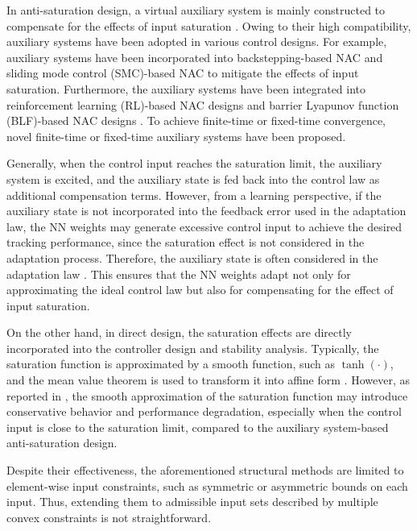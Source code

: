 \documentclass[letterpaper, journal]{IEEEtran}
\begin{document}
In anti-saturation design, a virtual auxiliary system is mainly constructed to compensate for the effects of input saturation \cite{Ma:2025aa,Gao:2026aa,Yang:2021aa,Jia:2020aa,Liu:2024aa,Liu:2025aa,Gao:2017aa,Esfandiari:2014aa,Esfandiari:2015aa,Yu:2022aa,Rezaei:2025aa,He:2016aa,He:2019aa,Zhao:2016aa,Peng:2020aa}.
Owing to their high compatibility, auxiliary systems have been adopted in various control designs.
For example, auxiliary systems have been incorporated into backstepping-based NAC \cite{Gao:2017aa} and sliding mode control (SMC)-based NAC \cite{Ma:2025aa} to mitigate the effects of input saturation.
Furthermore, the auxiliary systems have been integrated into reinforcement learning (RL)-based NAC designs \cite{Gao:2026aa} and barrier Lyapunov function (BLF)-based NAC designs \cite{Yang:2021aa}.
To achieve finite-time or fixed-time convergence, novel finite-time \cite{Jia:2020aa} or fixed-time \cite{Liu:2024aa,Liu:2025aa} auxiliary systems have been proposed.

Generally, when the control input reaches the saturation limit, the auxiliary system is excited, and the auxiliary state is fed back into the control law as additional compensation terms.
However, from a learning perspective, if the auxiliary state is not incorporated into the feedback error used in the adaptation law, the NN weights may generate excessive control input to achieve the desired tracking performance, since the saturation effect is not considered in the adaptation process.
Therefore, the auxiliary state is often considered in the adaptation law \cite{Gao:2017aa,Esfandiari:2014aa,Esfandiari:2015aa,Liu:2024aa,Liu:2025aa,Yu:2022aa,Rezaei:2025aa}.
This ensures that the NN weights adapt not only for approximating the ideal control law but also for compensating for the effect of input saturation.

On the other hand, in direct design, the saturation effects are directly incorporated into the controller design and stability analysis.
Typically, the saturation function is approximated by a smooth function, such as $\tanh(\cdot)$, and the mean value theorem is used to transform it into affine form \cite{Wang:2013aa,Cui:2014aa,Li:2024aa}.
However, as reported in \cite{Min:2021aa}, the smooth approximation of the saturation function may introduce conservative behavior and performance degradation, especially when the control input is close to the saturation limit, compared to the auxiliary system-based anti-saturation design.

Despite their effectiveness, the aforementioned structural methods are limited to element-wise input constraints, such as symmetric or asymmetric bounds on each input.
Thus, extending them to admissible input sets described by multiple convex constraints is not straightforward.
\end{document}
